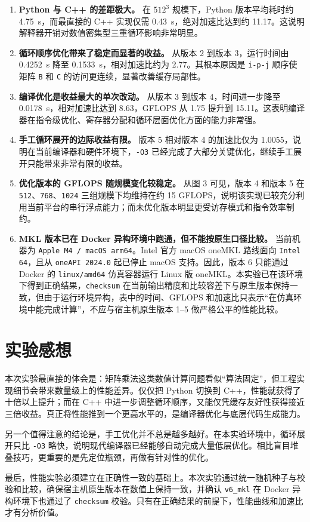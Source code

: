 \documentclass[UTF8,a4paper,12pt]{ctexart}
\begin{document}
\begin{enumerate}[leftmargin=2.2em]
  \item \textbf{Python 与 C++ 的差距极大。} 在 $512^3$ 规模下，Python 版本平均耗时约 \SI{4.75}{\second}，而最直接的 C++ 实现仅需 \SI{0.43}{\second}，绝对加速比达到约 \num{11.17}。这说明解释器开销对数值密集型三重循环影响非常明显。

  \item \textbf{循环顺序优化带来了稳定而显著的收益。} 从版本 2 到版本 3，运行时间由 \SI{0.4252}{\second} 降至 \SI{0.1533}{\second}，相对加速比约为 \num{2.77}。其根本原因是 \texttt{i-p-j} 顺序使矩阵 \texttt{B} 和 \texttt{C} 的访问更连续，显著改善缓存局部性。

  \item \textbf{编译优化是收益最大的单次改动。} 从版本 3 到版本 4，时间进一步降至 \SI{0.0178}{\second}，相对加速比达到 \num{8.63}，GFLOPS 从 \num{1.75} 提升到 \num{15.11}。这表明编译器在指令级优化、寄存器分配和循环层面优化方面的能力非常强。

  \item \textbf{手工循环展开的边际收益有限。} 版本 5 相对版本 4 的加速比仅为 \num{1.0055}，说明在当前编译器和硬件环境下，\texttt{-O3} 已经完成了大部分关键优化，继续手工展开只能带来非常有限的收益。

  \item \textbf{优化版本的 GFLOPS 随规模变化较稳定。} 从图 3 可见，版本 4 和版本 5 在 \texttt{512}、\texttt{768}、\texttt{1024} 三组规模下均维持在约 \num{15} GFLOPS，说明该实现已较充分利用当前平台的串行浮点能力；而未优化版本明显更受访存模式和指令效率制约。

  \item \textbf{MKL 版本已在 Docker 异构环境中跑通，但不能按原生口径比较。} 当前机器为 \texttt{Apple M4 / macOS arm64}。Intel 官方 macOS oneMKL 路线面向 \texttt{Intel 64}，且从 \texttt{oneAPI 2024.0} 起已停止 macOS 支持。因此，版本 6 只能通过 Docker 的 \texttt{linux/amd64} 仿真容器运行 Linux 版 oneMKL。本实验已在该环境下得到正确结果，\texttt{checksum} 在当前输出精度和比较容差下与原生版本保持一致，但由于运行环境异构，表中的时间、GFLOPS 和加速比只表示“在仿真环境中能完成计算”，不应与宿主机原生版本 1--5 做严格公平的性能比较。
\end{enumerate}

\section{实验感想}

本次实验最直接的体会是：矩阵乘法这类数值计算问题看似“算法固定”，但工程实现细节会带来数量级上的性能差异。仅仅把 Python 切换到 C++，性能就获得了十倍以上提升；而在 C++ 中进一步调整循环顺序，又能仅凭缓存友好性获得接近三倍收益。真正将性能推到一个更高水平的，是编译器优化与底层代码生成能力。

另一个值得注意的结论是，手工优化并不总是越多越好。在本实验环境中，循环展开只比 \texttt{-O3} 略快，说明现代编译器已经能够自动完成大量低层优化。相比盲目堆叠技巧，更重要的是先定位瓶颈，再做有针对性的优化。

最后，性能实验必须建立在正确性一致的基础上。本次实验通过统一随机种子与校验和比较，确保宿主机原生版本在数值上保持一致，并确认 \texttt{v6\_mkl} 在 Docker 异构环境下也通过了 \texttt{checksum} 校验。只有在正确结果的前提下，性能曲线和加速比才有分析价值。
\end{document}
